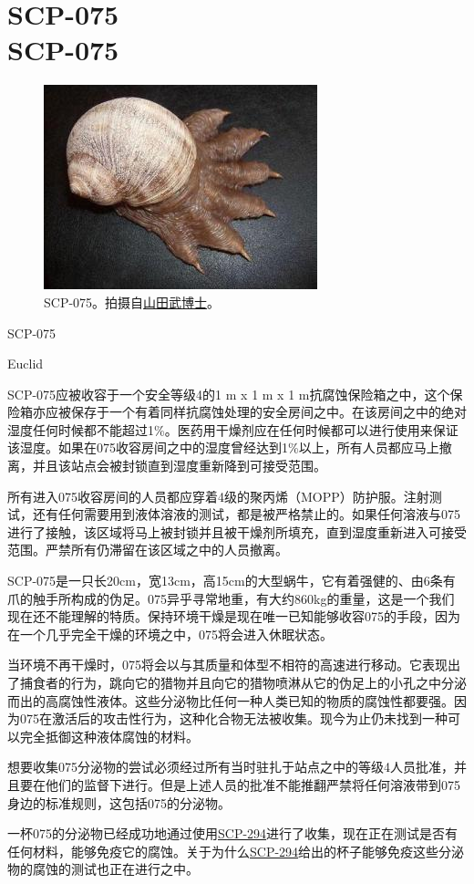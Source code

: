 \chapter[SCP-075]{
    SCP-075 \\
    SCP-075
}

\label{chap:SCP-075}

\begin{figure}[H]
    \centering
    \includegraphics[width=0.5\linewidth]{images/SCP.075.jpg}
    \caption*{SCP-075。拍摄自\hyperref[chap:]{山田武博士}。}
\end{figure}

SCP-075

Euclid

SCP-075应被收容于一个安全等级4的1 m x 1 m x 1 m抗腐蚀保险箱之中，这个保险箱亦应被保存于一个有着同样抗腐蚀处理的安全房间之中。在该房间之中的绝对湿度任何时候都不能超过1\%。医药用干燥剂应在任何时候都可以进行使用来保证该湿度。如果在075收容房间之中的湿度曾经达到1\%以上，所有人员都应马上撤离，并且该站点会被封锁直到湿度重新降到可接受范围。

所有进入075收容房间的人员都应穿着4级的聚丙烯（MOPP）防护服。注射测试，还有任何需要用到液体溶液的测试，都是被严格禁止的。如果任何溶液与075进行了接触，该区域将马上被封锁并且被干燥剂所填充，直到湿度重新进入可接受范围。严禁所有仍滞留在该区域之中的人员撤离。

SCP-075是一只长20cm，宽13cm，高15cm的大型蜗牛，它有着强健的、由6条有爪的触手所构成的伪足。075异乎寻常地重，有大约860kg的重量，这是一个我们现在还不能理解的特质。保持环境干燥是现在唯一已知能够收容075的手段，因为在一个几乎完全干燥的环境之中，075将会进入休眠状态。

当环境不再干燥时，075将会以与其质量和体型不相符的高速进行移动。它表现出了捕食者的行为，跳向它的猎物并且向它的猎物喷淋从它的伪足上的小孔之中分泌而出的高腐蚀性液体。这些分泌物比任何一种人类已知的物质的腐蚀性都要强。因为075在激活后的攻击性行为，这种化合物无法被收集。现今为止仍未找到一种可以完全抵御这种液体腐蚀的材料。

想要收集075分泌物的尝试必须经过所有当时驻扎于站点之中的等级4人员批准，并且要在他们的监督下进行。但是上述人员的批准不能推翻严禁将任何溶液带到075身边的标准规则，这包括075的分泌物。

一杯075的分泌物已经成功地通过使用\hyperref[chap:SCP-294]{SCP-294}进行了收集，现在正在测试是否有任何材料，能够免疫它的腐蚀。关于为什么\hyperref[chap:SCP-294]{SCP-294}给出的杯子能够免疫这些分泌物的腐蚀的测试也正在进行之中。
